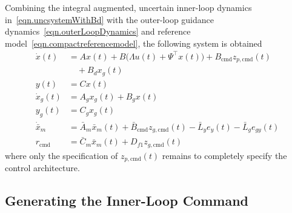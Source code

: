\documentclass[journal]{IEEEtran}
\theoremstyle{innercustomthm}
\begin{document}
  Combining the integral augmented, uncertain inner-loop dynamics in\ \eqref{eqn.uncsystemWithBd} with the outer-loop guidance dynamics\ \eqref{eqn.outerLoopDynamics} and reference model\ \eqref{eqn.compactreferencemodel}, the following system is obtained
  {%
    \small
    \begin{align}
      \label{eqn.plantAndCompactReferenceModel}
      \dot{x}(t)
      &=
      Ax(t) + B\bigr(\Lambda u(t)+\Psi^{\top}x(t)\bigr) + B_{\text{cmd}}z_{p,\text{cmd}}(t) \nonumber \\
      &\quad + B_{d}x_{g}(t) \nonumber \\
      y(t)
      &=
      Cx(t) \nonumber \\
      \dot{x}_{g}(t)
      &=
      A_{g}x_{g}(t) + B_{g}x(t) \\
      y_{g}(t)
      &=
      C_{g}x_{g}(t) \nonumber \\
      \dot{\bar{x}}_{m}
      &=
      \bar{A}_{m}\bar{x}_{m}(t) + \bar{B}_{\text{cmd}}z_{g,\text{cmd}}(t) - \bar{L}_{y}e_{y}(t) - \bar{L}_{g}e_{gy}(t) \nonumber \\
      r_{\text{cmd}}
      &=
      \bar{C}_{m}\bar{x}_{m}(t) + D_{f1}z_{g,\text{cmd}}(t) \nonumber
    \end{align}
  }%
  where only the specification of $z_{p,\text{cmd}}(t)$ remains to completely specify the control architecture.

  \subsection{Generating the Inner-Loop Command}
\end{document}
